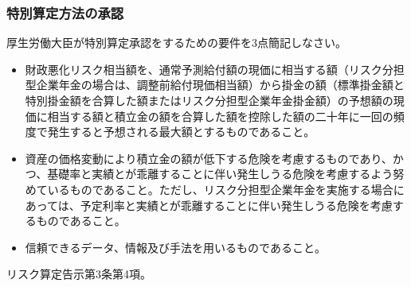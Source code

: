 \newpage

\subsubsection{特別算定方法の承認}

\begin{shortanswer}[年金2 2018 問題2(1)\textcircled{2}]
  厚生労働大臣が特別算定承認をするための要件を3点簡記しなさい。
\end{shortanswer}

\begin{answerbox}
  \begin{itemize}
    \item 財政悪化リスク相当額を、通常予測給付額の現価に相当する額（リスク分担型企業年金の場合は、調整前給付現価相当額）から掛金の額（標準掛金額と特別掛金額を合算した額またはリスク分担型企業年金掛金額）の予想額の現価に相当する額と積立金の額を合算した額を控除した額の二十年に一回の頻度で発生すると予想される最大額とするものであること。
    \item 資産の価格変動により積立金の額が低下する危険を考慮するものであり、かつ、基礎率と実績とが乖離することに伴い発生しうる危険を考慮するよう努めているものであること。ただし、リスク分担型企業年金を実施する場合にあっては、予定利率と実績とが乖離することに伴い発生しうる危険を考慮するものであること。
    \item 信頼できるデータ、情報及び手法を用いるものであること。
  \end{itemize}
\end{answerbox}

\begin{explanationbox}
  リスク算定告示第3条第4項。
\end{explanationbox}

